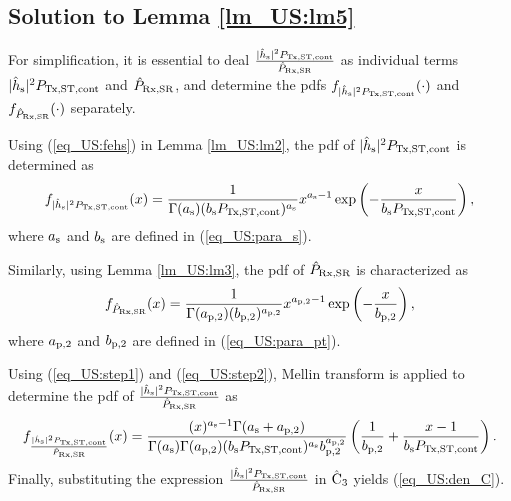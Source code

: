 \subsection{Solution to Lemma \ref{lm_US:lm5}} \label{ap:one}
\begin{IEEEproof}[Solution]
For simplification, it is essential to deal $\frac{|\hat{h}_{\text{s}}|^2 P_{\text{Tx,ST,cont}}}{\hat{P}_{\text{Rx,SR}}}$ as individual terms $|\hat{h}_{\text{s}}|^2 P_{\text{Tx,ST,cont}}$ and $\hat{P}_{\text{Rx,SR}}$, and determine the pdfs $f_{|\hat{h}_{\text{s}}|^2 P_{\text{Tx,ST,cont}}}(\cdot)$ and $f_{\hat{P}_{\text{Rx,SR}}}(\cdot)$ separately.

Using (\ref{eq_US:fehs}) in Lemma \ref{lm_US:lm2}, the pdf of $|\hat{h}_{\text{s}}|^2 P_{\text{Tx,ST,cont}}$ is determined as
\begin{align}
f_{|\hat{h}_{\text{s}}|^2 P_{\text{Tx,ST,cont}}}(x) = \frac{1}{\Gamma(a_{\text{s}}) (b_{\text{s}} P_{\text{Tx,ST,cont}})^{a_{\text{s}}}} x^{a_{\text{s}} - 1} \exp\left( - \frac{x}{ b_{\text{s}} P_{\text{Tx,ST,cont}}} \right), \label{eq_US:step1} 
\end{align}
where $a_{\text{s}}$ and $b_{\text{s}}$ are defined in (\ref{eq_US:para_s}).

Similarly, using Lemma \ref{lm_US:lm3}, the pdf of $\hat{P}_{\text{Rx,SR}}$ is characterized as
\begin{align}
f_{\hat{P}_{\text{Rx,SR}}}(x) = \frac{1}{\Gamma(a_{\text{p,2}}) (b_{\text{p,2}})^{a_{\text{p,2}}}} x^{a_{\text{p,2}} - 1} \exp\left( - \frac{x}{ b_{\text{p,2}}} \right), \label{eq_US:step2} 
\end{align}
where $a_{\text{p,2}}$ and $b_{\text{p,2}}$ are defined in (\ref{eq_US:para_pt}).

Using (\ref{eq_US:step1}) and (\ref{eq_US:step2}), Mellin transform \cite{NIST} is applied to determine the pdf of $\frac{|\hat{h}_{\text{s}}|^2 P_{\text{Tx,ST,cont}}}{\hat{P}_{\text{Rx,SR}}}$ as
\begin{align}
f_{\frac{|\hat{h}_{\text{s}}|^2 P_{\text{Tx,ST,cont}}}{\hat{P}_{\text{Rx,SR}}}}(x) = \frac{(x)^{a_{\text{s}} - 1} \Gamma(a_{\text{s}} + a_{\text{p,2}})}{\Gamma(a_{\text{s}}) \Gamma(a_{\text{p,2}}) (b_{\text{s}} P_{\text{Tx,ST,cont}}) ^{a_{\text{s}}} b_{\text{p,2}}^{a_{\text{p,2}}}} \left(\frac{1}{b_{\text{p,2}}} + \frac{x - 1}{b_{\text{s}} P_{\text{Tx,ST,cont}}}\right).
\end{align}
Finally, substituting the expression $\frac{|\hat{h}_{\text{s}}|^2 P_{\text{Tx,ST,cont}}}{\hat{P}_{\text{Rx,SR}}}$ in $\hat{\text{{C}}}_{\text{3}}$ yields (\ref{eq_US:den_C}).
\end{IEEEproof}


